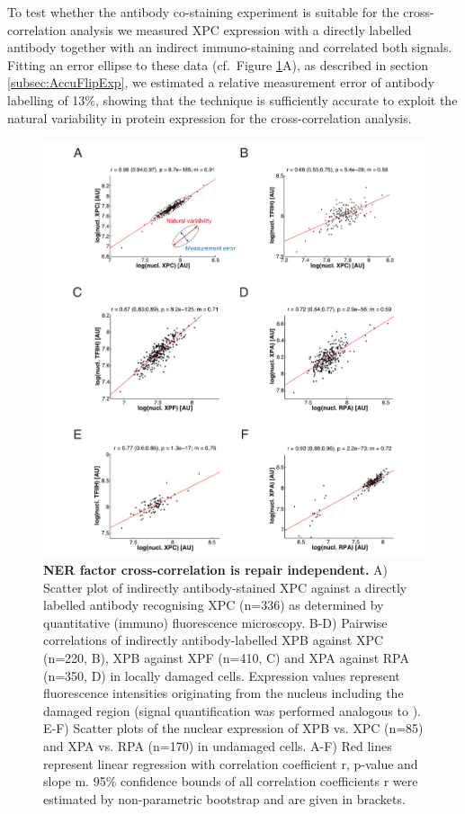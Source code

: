 To test whether the antibody co-staining experiment is suitable for the cross-correlation analysis we measured XPC expression with a directly labelled antibody together with an indirect immuno-staining and correlated both signals. Fitting an error ellipse to these data (cf.\ Figure \ref{fig:coExpressionData}A), as described in section  \ref{subsec:AccuFlipExp}, we estimated a relative measurement error of antibody labelling of 13\%, showing that the technique is sufficiently accurate to exploit the natural variability in protein expression for the cross-correlation analysis.
\begin{figure}[htbp]
	\begin{center}
		\includegraphics[width=1\textwidth]{Abbildungen/figureTAC_2.pdf}
		\caption{\textbf{NER factor cross-correlation is repair independent.} A) Scatter plot of indirectly antibody-stained XPC against a directly labelled antibody recognising XPC (n=336) as determined by quantitative (immuno) fluorescence microscopy. B-D) Pairwise correlations of indirectly antibody-labelled XPB against XPC (n=220, B), XPB against XPF (n=410, C) and XPA against RPA (n=350, D) in locally damaged cells. Expression values represent fluorescence intensities originating from the nucleus including the damaged region (signal quantification was performed analogous to \cite{Luijsterburg2010}). E-F) Scatter plots of the nuclear expression of XPB vs. XPC (n=85) and XPA vs. RPA (n=170) in undamaged cells. A-F) Red lines represent linear regression with correlation coefficient r, p-value and slope m. 95\% confidence bounds of all correlation coefficients r were estimated by non-parametric bootstrap and are given in brackets. }
		\label{fig:coExpressionData}
	\end{center}
\end{figure}

